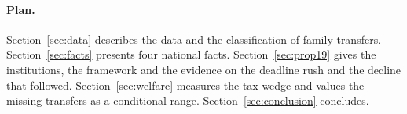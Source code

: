 \paragraph{Plan.} Section~\ref{sec:data} describes the data and the classification of family transfers. Section~\ref{sec:facts} presents four national facts. Section~\ref{sec:prop19} gives the institutions, the framework and the evidence on the deadline rush and the decline that followed. Section~\ref{sec:welfare} measures the tax wedge and values the missing transfers as a conditional range. Section~\ref{sec:conclusion} concludes.
